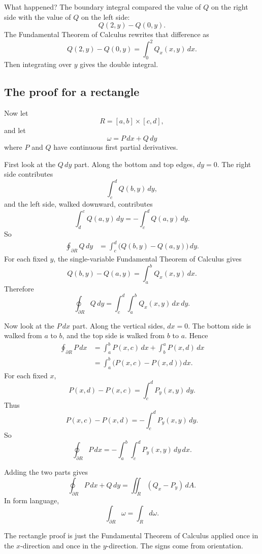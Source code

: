 What happened?  The boundary integral compared the value of \(Q\) on the right side
with the value of \(Q\) on the left side:
\[
    Q(2,y)-Q(0,y).
\]
The Fundamental Theorem of Calculus rewrites that difference as
\[
    Q(2,y)-Q(0,y)=\int_0^2 Q_x(x,y)\,dx.
\]
Then integrating over \(y\) gives the double integral.

\subsection{The proof for a rectangle}

Now let
\[
    R=[a,b]\times[c,d],
\]
and let
\[
    \omega=P\,dx+Q\,dy
\]
where \(P\) and \(Q\) have continuous first partial derivatives.

First look at the \(Q\,dy\) part.  Along the bottom and top edges, \(dy=0\).  The right
side contributes
\[
    \int_c^d Q(b,y)\,dy,
\]
and the left side, walked downward, contributes
\[
    \int_d^c Q(a,y)\,dy
    =
    -\int_c^d Q(a,y)\,dy.
\]
So
\[
\begin{aligned}
    \oint_{\partial R} Q\,dy
    &=
    \int_c^d \bigl(Q(b,y)-Q(a,y)\bigr)\,dy.
\end{aligned}
\]
For each fixed \(y\), the single-variable Fundamental Theorem of Calculus gives
\[
    Q(b,y)-Q(a,y)=\int_a^b Q_x(x,y)\,dx.
\]
Therefore
\[
\boxed{
    \oint_{\partial R}Q\,dy
    =
    \int_c^d\int_a^b Q_x(x,y)\,dx\,dy.
}
\]

Now look at the \(P\,dx\) part.  Along the vertical sides, \(dx=0\).  The bottom side is
walked from \(a\) to \(b\), and the top side is walked from \(b\) to \(a\).  Hence
\[
\begin{aligned}
    \oint_{\partial R} P\,dx
    &=
    \int_a^b P(x,c)\,dx+\int_b^a P(x,d)\,dx\\
    &=
    \int_a^b \bigl(P(x,c)-P(x,d)\bigr)\,dx.
\end{aligned}
\]
For each fixed \(x\),
\[
    P(x,d)-P(x,c)=\int_c^d P_y(x,y)\,dy.
\]
Thus
\[
    P(x,c)-P(x,d)
    =
    -\int_c^d P_y(x,y)\,dy.
\]
So
\[
\boxed{
    \oint_{\partial R}P\,dx
    =
    -\int_a^b\int_c^d P_y(x,y)\,dy\,dx.
}
\]

Adding the two parts gives
\[
\boxed{
    \oint_{\partial R}P\,dx+Q\,dy
    =
    \iint_R (Q_x-P_y)\,dA.
}
\]
In form language,
\[
\boxed{
    \int_{\partial R}\omega=\int_R d\omega.
}
\]

The rectangle proof is just the Fundamental Theorem of Calculus applied once in the
\(x\)-direction and once in the \(y\)-direction.  The signs come from orientation.

